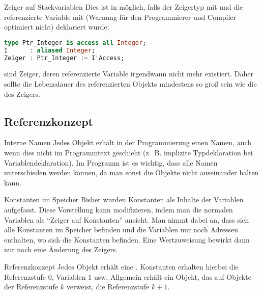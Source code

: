 \begin{Def}{Zeiger auf Stackvariablen}
    Dies ist in \Ada{} möglich, falls der Zeigertyp mit  und die
    referenzierte Variable mit  (Warnung für den Programmierer
    und Compiler optimiert nicht)
    deklariert wurde:
    
\begin{lstlisting}[language=ada]
type Ptr_Integer is access all Integer;
I      : aliased Integer;
Zeiger : Ptr_Integer := I'Access;
\end{lstlisting}
    
     sind Zeiger, deren referenzierte Variable
    irgendwann nicht mehr existiert. Daher sollte die Lebensdauer des
    referenzierten Objekts mindestens so groß sein wie die des Zeigers.
\end{Def}

\subsection{%
    Referenzkonzept%
}

\begin{Def}{Interne Namen}
    Jedes Objekt erhält in der Programmierung einen Namen, auch wenn dies nicht
    im Programmtext geschieht (z.~B. implizite Typdeklaration bei
    Variablendeklaration).
    Im Programm ist es wichtig, dass alle Namen unterschieden werden können,
    da man sonst die Objekte nicht auseinander halten kann.
\end{Def}

\begin{Def}{Konstanten im Speicher}
    Bisher wurden Konstanten als Inhalte der Variablen aufgefasst.
    Diese Vorstellung kann modifizieren, indem man die normalen Variablen als
    "`Zeiger auf Konstanten"' ansieht.
    Man nimmt dabei an, dass sich alle Konstanten im Speicher befinden und die
    Variablen nur noch Adressen enthalten, wo sich die Konstanten befinden.
    Eine Wertzuweisung bewirkt dann nur noch eine Änderung des Zeigers.
\end{Def}

\begin{Def}{Referenzkonzept}
    Jedes Objekt erhält eine .
    Konstanten erhalten hierbei die Referenzstufe $0$, Variablen $1$ usw.
    Allgemein erhält ein Objekt, das auf Objekte der Referenzstufe $k$
    verweist, die Referenzstufe $k + 1$.
\end{Def}

